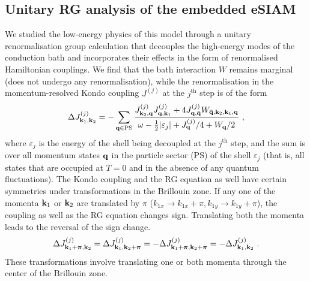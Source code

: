 \documentclass[reprint,hidelinks,onecolumn]{revtex4-2}
\begin{document}
\subsection{Unitary RG analysis of the embedded eSIAM}
We studied the low-energy physics of this model through a unitary renormalisation group calculation that decouples the high-energy modes of the conduction bath and incorporates their effects in the form of renormalised Hamiltonian couplings. We find that the bath interaction \(W\) remains marginal (does not undergo any renormalisation), while the renormalisation in the momentum-resolved Kondo coupling \(J^{(j)}\) at the \(j^\text{th}\) step is of the form
\begin{equation}\begin{aligned}\label{KondoRGequation}
	\Delta J^{(j)}_{{\bf k}_1, {\bf k}_2} = -\sum_{{\bf q} \in \text{PS}} \frac{J^{(j)}_{{\bf k}_2,{\bf q}} J^{(j)}_{{\bf q},{\bf k}_1} + 4J^{(j)}_{{\bf q}, {\bf \bar q}} W_{{\bf \bar q}, {\bf k}_2, {\bf k}_1, {\bf q}}}{\omega - \frac{1}{2}|\varepsilon_j| + J^{(j)}_{{\bf q}}/4 + W_{{\bf q}}/2}~,
\end{aligned}\end{equation}
where \(\varepsilon_j\) is the energy of the shell being decoupled at the \(j^\text{th}\) step, and the sum is over all momentum states \({\bf q}\) in the particle sector (PS) of the shell \(\varepsilon_j\) (that is, all states that are occupied at \(T=0\) and in the absence of any quantum fluctuations). The Kondo coupling and the RG equation as well have certain symmetries under transformations in the Brillouin zone. If any one of the momenta \({\bf k}_1\) or \({\bf k}_2\) are translated by \(\pi\) (\(k_{1x} \to k_{1x} + \pi, k_{1y} \to k_{1y}+\pi\)), the coupling as well as the RG equation changes sign. Translating both the momenta leads to the reversal of the sign change. 
\begin{equation}\begin{aligned}\label{hamiltonanSymms}
	\Delta J^{(j)}_{{\bf k}_1 + \boldsymbol{\pi}, {\bf k}_2} = \Delta J^{(j)}_{{\bf k}_1, {\bf k}_2 + \boldsymbol{\pi}} = -\Delta J^{(j)}_{{\bf k}_1 + \boldsymbol{\pi}, {\bf k}_2 + \boldsymbol{\pi}} = -\Delta J^{(j)}_{{\bf k}_1, {\bf k}_2}~.
\end{aligned}\end{equation}
These transformations involve translating one or both momenta through the center of the Brillouin zone.
\end{document}
